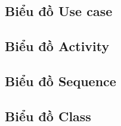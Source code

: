 \subsection{Biểu đồ Use case}

\subsection{Biểu đồ Activity}

\subsection{Biểu đồ Sequence}


\subsection{Biểu đồ Class}

